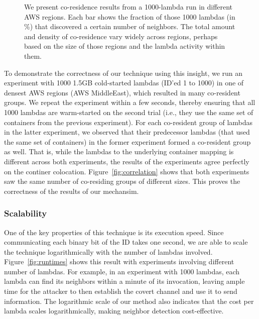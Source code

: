 \begin{figure}[!t]
\begin{subfigure}{.33\textwidth}
  \end{subfigure}
  \caption{We present co-residence results from a 1000-lambda run in different AWS regions. Each bar shows the fraction 
  of those 1000 lambdas (in \%) that discovered a certain number of neighbors. The total amount and density of co-residence 
  vary widely across regions, perhaps based on the size of those regions and the lambda activity within them. }
  \label{fig:awsregions}
  \end{figure}

To demonstrate the correctness of our technique using this insight, we run an
experiment with 1000 1.5GB cold-started lambdas (ID'ed 1 to 1000) in one of
densest AWS regions (AWS MiddleEast), which resulted in many co-resident groups.
We repeat the experiment within a few seconds, thereby ensuring that all 1000
lambdas are warm-started on the second trial (i.e., they use the same set of
containers from the previous experiment).  For each co-resident group of lambdas
in the latter experiment, we observed that their predecessor lambdas (that used
the same set of containers) in the former experiment formed a co-resident group
as well.  That is, while the lambdas to the underlying container mapping is
different across both experiments, the results of the experiments agree
perfectly on the continer colocation. Figure~\ref{fig:correlation} shows that
both experiments saw the same number of co-residing groups of different sizes.
This proves the correctness of the results of our mechansim.

\subsubsection{Scalability}
One of the key properties of this technique is its execution speed. Since
communicating each binary bit of the ID takes one second, we are able to scale
the technique logarithmically with the number of lambdas involved.
Figure~\ref{fig:runtimes} shows this result with experiments involving
different number of lambdas. For example, in an experiment with 1000 lambdas,
each lambda can find its neighbors within a minute of its invocation, leaving
ample time for the attacker to then establish the covert channel and use it to 
send information. The logarithmic scale of our method also indicates that the 
cost per lambda scales logarithmically, making neighbor detection cost-effective.





